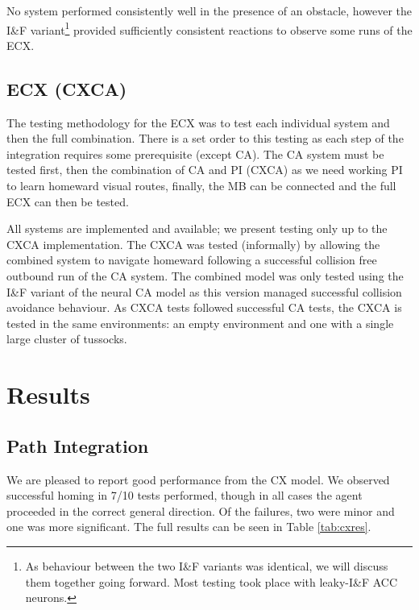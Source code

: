 \documentclass[a4paper,11pt,twoside,openright]{article}
\let\oldsection\section
\def\section{\cleardoublepage\oldsection}
\begin{document}
No system performed consistently well in the presence of an obstacle,
however the I\&F variant\footnote{As behaviour between the two I\&F
  variants was identical, we will discuss them together going
  forward. Most testing took place with leaky-I\&F ACC neurons.}
provided sufficiently consistent reactions to observe some runs of the
ECX.

\subsection{ECX (CXCA)}
The testing methodology for the ECX was to test each individual system
and then the full combination. There is a set order to this testing as
each step of the integration requires some prerequisite (except
CA). The CA system must be tested first, then the combination of CA
and PI (CXCA) as we need working PI to learn homeward visual routes,
finally, the MB can be connected and the full ECX can then be tested.
\newline\par

All systems are implemented and available; we present testing only up
to the CXCA implementation. The CXCA was tested (informally) by
allowing the combined system to navigate homeward following a
successful collision free outbound run of the CA system. The combined
model was only tested using the I\&F variant of the neural CA model as
this version managed successful collision avoidance behaviour. As CXCA
tests followed successful CA tests, the CXCA is tested in the same
environments: an empty environment and one with a single large cluster
of tussocks.


\section{ Results } \label{sec:results}
\subsection{ Path Integration }
We are pleased to report good performance from the CX model. We
observed successful homing in 7/10 tests performed, though in all
cases the agent proceeded in the correct general direction. Of the
failures, two were minor and one was more significant. The full
results can be seen in Table \ref{tab:cxres}.
\newline
\par
\end{document}
